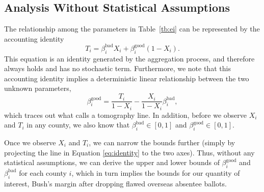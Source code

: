 \documentclass[11pt,titlepage]{article}
\newcommand{\bb}{\beta^{\text{bad}}}
\newcommand{\bg}{\beta^{\text{good}}}
\begin{document}
\subsection{Analysis Without Statistical Assumptions} \label{s:noassump}

The relationship among the parameters in Table~\ref{tb:ei} can be
represented by the accounting identity
\begin{equation}
  T_i=\bb_i X_i+\bg_i (1-X_i).
\end{equation} 
This equation is an identity generated by the aggregation process, and
therefore always holds and has no stochastic term.  Furthermore, we
note that this accounting identity implies a deterministic linear
relationship between the two unknown parameters,
\begin{equation} \label{eq:identity}
\bg_i = \frac{T_i}{1-X_i}-\frac{X_i}{1-X_i}\bb_i,
\end{equation}
which traces out what \citet{king:97} calls a tomography line.  In
addition, before we observe $X_i$ and $T_i$ in any county, we also
know that $\bb_i\in[0,1]$ and $\bg_i\in[0,1]$.

Once we observe $X_i$ and $T_i$, we can narrow the bounds further
(simply by projecting the line in Equation \ref{eq:identity} to the
two axes).  Thus, without any statistical assumptions, we can derive
the upper and lower bounds of $\bg_i$ and $\bb_i$ for each county $i$,
which in turn implies the bounds for our quantity of interest, Bush's
margin after dropping flawed overseas absentee ballots.
\end{document}
